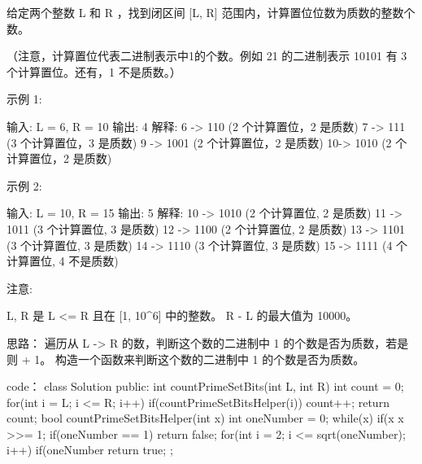 给定两个整数 L 和 R ，找到闭区间 [L, R] 范围内，计算置位位数为质数的整数个数。

（注意，计算置位代表二进制表示中1的个数。例如 21 的二进制表示 10101 有 3 个计算置位。还有，1 不是质数。）

示例 1:

输入: L = 6, R = 10
输出: 4
解释:
6 -> 110 (2 个计算置位，2 是质数)
7 -> 111 (3 个计算置位，3 是质数)
9 -> 1001 (2 个计算置位，2 是质数)
10-> 1010 (2 个计算置位，2 是质数)

示例 2:

输入: L = 10, R = 15
输出: 5
解释:
10 -> 1010 (2 个计算置位, 2 是质数)
11 -> 1011 (3 个计算置位, 3 是质数)
12 -> 1100 (2 个计算置位, 2 是质数)
13 -> 1101 (3 个计算置位, 3 是质数)
14 -> 1110 (3 个计算置位, 3 是质数)
15 -> 1111 (4 个计算置位, 4 不是质数)

注意:

    L, R 是 L <= R 且在 [1, 10^6] 中的整数。
    R - L 的最大值为 10000。


































思路：
遍历从 L -> R 的数，判断这个数的二进制中 1 的个数是否为质数，若是则 + 1。
构造一个函数来判断这个数的二进制中 1 的个数是否为质数。
































code：
class Solution {
public:
    int countPrimeSetBits(int L, int R) {
        int count = 0;
        for(int i = L; i <= R; i++)
        {
            if(countPrimeSetBitsHelper(i)) count++;
        }
        return count;
    }
    bool countPrimeSetBitsHelper(int x)
    {
        int oneNumber = 0;
        while(x)
        {
            if(x %
            x >>= 1;
        }
        if(oneNumber == 1) return false;
        for(int i = 2; i <= sqrt(oneNumber); i++)
        {
            if(oneNumber %
        }
        return true;
    }
};